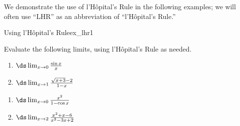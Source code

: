 We demonstrate the use of l'H\^opital's Rule in the following examples; we will often use ``LHR'' as an abbreviation of ``l'H\^opital's Rule.''\\


\begin{example}{Using l'H\^opital's Rule}{ex_lhr1}
{
Evaluate the following limits, using l'H\^opital's Rule as needed.

\noindent%
\begin{minipage}[t]{.5\textwidth}
\begin{enumerate}
\item		$\ds \lim_{x\to0}\frac{\sin x}x$
\item		$\ds \lim_{x\to 1}\frac{\sqrt{x+3}-2}{1-x}$
\end{enumerate}
\end{minipage}
\begin{minipage}[t]{.5\textwidth}
\begin{enumerate}\addtocounter{enumi}{2}
\item		$\ds \lim_{x\to0}\frac{x^2}{1-\cos x}$
\item		$\ds \lim_{x\to 2}\frac{x^2+x-6}{x^2-3x+2}$
\end{enumerate}
\end{minipage}
}

\end{example}



